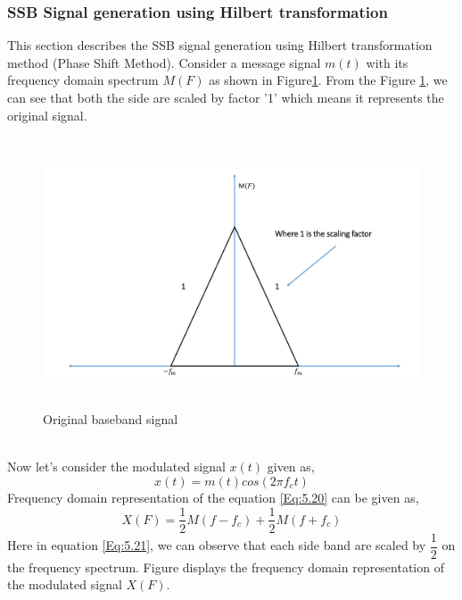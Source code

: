 \subsubsection{SSB Signal generation using Hilbert transformation}
This section describes the SSB signal generation using Hilbert transformation method (Phase Shift Method). Consider a message signal $m(t)$ with its frequency domain spectrum $M(F)$ as shown in Figure\ref{Original_baseband_signal}. From the Figure \ref{Original_baseband_signal}, we can see that both the side are scaled by factor '1' which means it represents the original signal.
\begin{figure}[h]
	\centering
	\includegraphics[width=1.0\textwidth, height=8cm]{./sdf/simplified_coherent_receiver/figures/SSB1.pdf}
	\caption{Original baseband signal}\label{Original_baseband_signal}
\end{figure}\\ 	
Now let's consider the modulated signal $x(t)$ given as,
\begin{equation}
x(t)=m(t) cos(2\pi f_c t)
\label{Eq:5.20}
\end{equation}
Frequency domain representation of the equation \ref{Eq:5.20} can be given as,
\begin{equation}
X(F)=\frac{1}{2}M(f-f_c)+\frac{1}{2}M(f+f_c)
\label{Eq:5.21}
\end{equation}
Here in equation \ref{Eq:5.21}, we can observe that each side band are scaled by $\dfrac{1}{2}$ on the frequency spectrum. Figure displays the frequency domain representation of the modulated signal $X(F)$.
